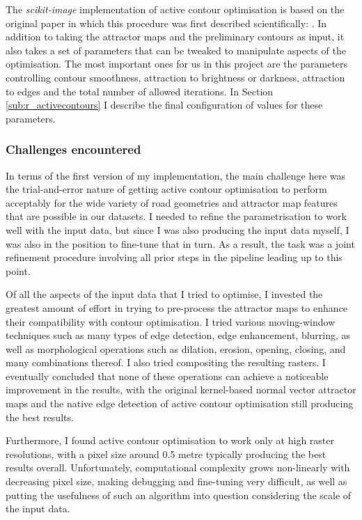The \textit{scikit-image} implementation of active contour optimisation is based on the original paper in which this procedure was first described scientifically: \cite{kass_etal_1988}. In addition to taking the attractor maps and the preliminary contours as input, it also takes a set of parameters that can be tweaked to manipulate aspects of the optimisation. The most important ones for us in this project are the parameters controlling contour smoothness, attraction to brightness or darkness, attraction to edges and the total number of allowed iterations. In Section \ref{sub:r_activecontours} I describe the final configuration of values for these parameters.

\subsubsection{Challenges encountered}

In terms of the first version of my implementation, the main challenge here was the trial-and-error nature of getting active contour optimisation to perform acceptably for the wide variety of road geometries and attractor map features that are possible in our datasets. I needed to refine the parametrisation to work well with the input data, but since I was also producing the input data myself, I was also in the position to fine-tune that in turn. As a result, the task was a joint refinement procedure involving all prior steps in the pipeline leading up to this point.

Of all the aspects of the input data that I tried to optimise, I invested the greatest amount of effort in trying to pre-process the attractor maps to enhance their compatibility with contour optimisation. I tried various moving-window techniques such as many types of edge detection, edge enhancement, blurring, as well as morphological operations such as dilation, erosion, opening, closing, and many combinations thereof. I also tried compositing the resulting rasters. I eventually concluded that none of these operations can achieve a noticeable improvement in the results, with the original kernel-based normal vector attractor maps and the native edge detection of active contour optimisation still producing the best results.

Furthermore, I found active contour optimisation to work only at high raster resolutions, with a pixel size around 0.5 metre typically producing the best results overall. Unfortunately, computational complexity grows non-linearly with decreasing pixel size, making debugging and fine-tuning very difficult, as well as putting the usefulness of such an algorithm into question considering the scale of the input data.

